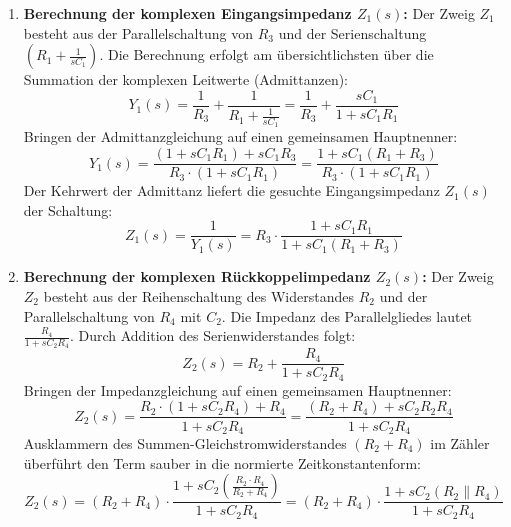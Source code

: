 \documentclass[11pt,a4paper]{article}
\begin{document}
\begin{enumerate}
    \item \textbf{Berechnung der komplexen Eingangsimpedanz $Z_1(s)$:}
    Der Zweig $Z_1$ besteht aus der Parallelschaltung von $R_3$ und der Serienschaltung $(R_1 + \frac{1}{sC_1})$. Die Berechnung erfolgt am übersichtlichsten über die Summation der komplexen Leitwerte (Admittanzen):
    \begin{equation}
    Y_1(s) = \frac{1}{R_3} + \frac{1}{R_1 + \frac{1}{sC_1}} = \frac{1}{R_3} + \frac{sC_1}{1 + sC_1 R_1}
    \end{equation}
    Bringen der Admittanzgleichung auf einen gemeinsamen Hauptnenner:
    \begin{equation}
    Y_1(s) = \frac{(1 + sC_1 R_1) + sC_1 R_3}{R_3 \cdot (1 + sC_1 R_1)} = \frac{1 + sC_1(R_1 + R_3)}{R_3 \cdot (1 + sC_1 R_1)}
    \end{equation}
    Der Kehrwert der Admittanz liefert die gesuchte Eingangsimpedanz $Z_1(s)$ der Schaltung:
    \begin{equation}
    Z_1(s) = \frac{1}{Y_1(s)} = R_3 \cdot \frac{1 + sC_1 R_1}{1 + sC_1(R_1 + R_3)}
    \end{equation}

    \item \textbf{Berechnung der komplexen Rückkoppelimpedanz $Z_2(s)$:}
    Der Zweig $Z_2$ besteht aus der Reihenschaltung des Widerstandes $R_2$ und der Parallelschaltung von $R_4$ mit $C_2$. Die Impedanz des Parallelgliedes lautet $\frac{R_4}{1 + sC_2 R_4}$. Durch Addition des Serienwiderstandes folgt:
    \begin{equation}
    Z_2(s) = R_2 + \frac{R_4}{1 + sC_2 R_4}
    \end{equation}
    Bringen der Impedanzgleichung auf einen gemeinsamen Hauptnenner:
    \begin{equation}
    Z_2(s) = \frac{R_2 \cdot (1 + sC_2 R_4) + R_4}{1 + sC_2 R_4} = \frac{(R_2 + R_4) + sC_2 R_2 R_4}{1 + sC_2 R_4}
    \end{equation}
    Ausklammern des Summen-Gleichstromwiderstandes $(R_2 + R_4)$ im Zähler überführt den Term sauber in die normierte Zeitkonstantenform:
    \begin{equation}
    Z_2(s) = (R_2 + R_4) \cdot \frac{1 + sC_2 \left(\frac{R_2 \cdot R_4}{R_2 + R_4}\right)}{1 + sC_2 R_4} = (R_2 + R_4) \cdot \frac{1 + sC_2 (R_2 \parallel R_4)}{1 + sC_2 R_4}
    \end{equation}


\end{enumerate}
\end{document}
